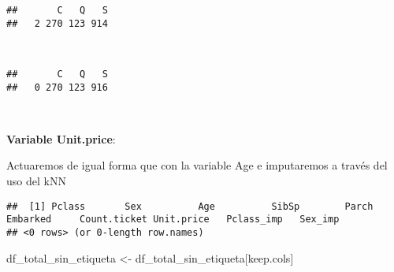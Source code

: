 \documentclass[
]{article}
\newenvironment{Shaded}{\begin{snugshade}}{\end{snugshade}}
\newcommand{\CommentTok}[1]{\textcolor[rgb]{0.56,0.35,0.01}{\textit{#1}}}
\newcommand{\DataTypeTok}[1]{\textcolor[rgb]{0.13,0.29,0.53}{#1}}
\newcommand{\DecValTok}[1]{\textcolor[rgb]{0.00,0.00,0.81}{#1}}
\newcommand{\KeywordTok}[1]{\textcolor[rgb]{0.13,0.29,0.53}{\textbf{#1}}}
\newcommand{\NormalTok}[1]{#1}
\newcommand{\OperatorTok}[1]{\textcolor[rgb]{0.81,0.36,0.00}{\textbf{#1}}}
\newcommand{\StringTok}[1]{\textcolor[rgb]{0.31,0.60,0.02}{#1}}
\begin{document}
\begin{verbatim}
##       C   Q   S 
##   2 270 123 914
\end{verbatim}

\texttt{}\\
\texttt{}

\begin{Shaded}
\end{Shaded}

\begin{verbatim}
##       C   Q   S 
##   0 270 123 916
\end{verbatim}

\texttt{}~\\
\texttt{}

\textbf{Variable Unit.price}: \texttt{}

Actuaremos de igual forma que con la variable Age e imputaremos a través
del uso del kNN

\texttt{}

\begin{Shaded}
\end{Shaded}

\begin{verbatim}
##  [1] Pclass       Sex          Age          SibSp        Parch        Embarked     Count.ticket Unit.price   Pclass_imp   Sex_imp     
## <0 rows> (or 0-length row.names)
\end{verbatim}

\begin{Shaded}
\begin{Highlighting}[]
\NormalTok{df_total_sin_etiqueta <-}\StringTok{ }\NormalTok{df_total_sin_etiqueta[keep.cols]}
\end{Highlighting}
\end{Shaded}
\end{document}
